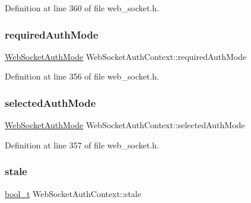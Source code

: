 Definition at line 360 of file web\+\_\+socket.\+h.

\mbox{\label{structWebSocketAuthContext_a50c3cdd7ca2e85e2f1de07c0312320aa}} 
\subsubsection{\texorpdfstring{required\+Auth\+Mode}{requiredAuthMode}}
{\footnotesize\ttfamily \hyperlink{web__socket_8h_a2c2f8d99948379e06bb22ea64745ba77}{Web\+Socket\+Auth\+Mode} Web\+Socket\+Auth\+Context\+::required\+Auth\+Mode}



Definition at line 356 of file web\+\_\+socket.\+h.

\mbox{\label{structWebSocketAuthContext_ab75d64b66c1e870bea0affdc5c2bf492}} 
\subsubsection{\texorpdfstring{selected\+Auth\+Mode}{selectedAuthMode}}
{\footnotesize\ttfamily \hyperlink{web__socket_8h_a2c2f8d99948379e06bb22ea64745ba77}{Web\+Socket\+Auth\+Mode} Web\+Socket\+Auth\+Context\+::selected\+Auth\+Mode}



Definition at line 357 of file web\+\_\+socket.\+h.

\mbox{\label{structWebSocketAuthContext_a19357f3f322cd3ffeb07fb8fed174181}} 
\subsubsection{\texorpdfstring{stale}{stale}}
{\footnotesize\ttfamily \hyperlink{compiler__port_8h_a812d16e5494522586b3784e55d479912}{bool\+\_\+t} Web\+Socket\+Auth\+Context\+::stale}




